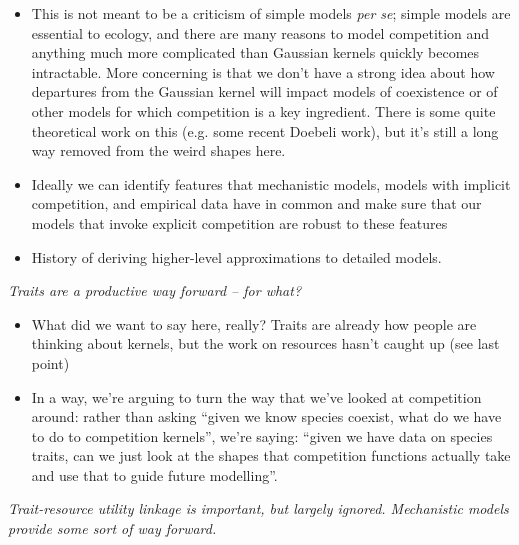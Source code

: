 \documentclass[a4paper,11pt]{article}
\begin{document}
\begin{itemize}
 \item This is not meant to be a criticism of simple models \textit{per
  se}; simple models are essential to ecology, and there are many
  reasons to model competition and anything much more complicated than
  Gaussian kernels quickly becomes intractable.  More concerning is
  that we don't have a strong idea about how departures from the
  Gaussian kernel will impact models of coexistence or of other models
  for which competition is a key ingredient.  There is some quite
  theoretical work on this (e.g. some recent Doebeli work), but it's
  still a long way removed from the weird shapes here.
\item Ideally we can identify features that mechanistic models, models
  with implicit competition, and empirical data have in common and make
  sure that our models that invoke explicit competition are robust to
  these features
\item History of deriving higher-level approximations to detailed models. 
\end{itemize}

\textit{Traits are a productive way forward -- for what?}

\begin{itemize}
\item What did we want to say here, really?  Traits are already how
  people are thinking about kernels, but the work on resources hasn't
  caught up (see last point)
\item In a way, we're arguing to turn the way that we've looked at
  competition around: rather than asking ``given we know species
  coexist, what do we have to do to competition kernels'', we're
  saying: ``given we have data on species traits, can we just look at
  the shapes that competition functions actually take and use that to
  guide future modelling''.
\end{itemize}


\textit{Trait-resource utility linkage is important, but largely
  ignored.  Mechanistic models provide some sort of way forward.}
\end{document}
